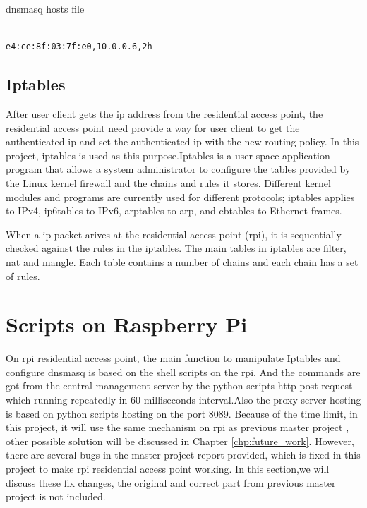\begin{algorithm}[h]
  \caption{dnsmasq hosts file}
  \label{code:dnsmasq_hosts}
  \begin{verbatim}
  
e4:ce:8f:03:7f:e0,10.0.0.6,2h
 \end{verbatim}
\end{algorithm}

\subsection{Iptables}
\par After user client gets the \gls{ip} address from the residential access point, the residential access point need provide a way for user client to get the authenticated \gls{ip} and set the authenticated \gls{ip} with the new routing policy. In this project, iptables\cite{iptables} is used as this purpose.Iptables is a user space application program that allows a system administrator to configure the tables provided by the Linux kernel firewall and the chains and rules it stores. Different kernel modules and programs are currently used for different protocols; iptables applies to IPv4, ip6tables to IPv6, arptables to \gls{arp}, and ebtables to Ethernet frames.
\par When a \gls{ip} packet arives at the residential access point (\gls{rpi}), it is sequentially checked against the rules in the iptables. The main tables in iptables are filter, nat and mangle. Each table contains a number of chains and each chain has a set of rules.

\section{Scripts on Raspberry Pi}
\label{sec:scripts_rpi}
\par On \gls{rpi} residential access point, the main function to manipulate Iptables and configure dnsmasq is based on the shell scripts on the \gls{rpi}. And the commands are got from the central management server by the python scripts \gls{http} post request which running repeatedly in 60 milliseconds interval.Also the proxy server hosting is based on python scripts hosting on the port 8089. Because of the time limit, in this project, it will use the same mechanism on \gls{rpi} as previous master project \cite{TorgeirMR}, other possible solution will be discussed in Chapter \ref{chp:future_work}. However, there are several bugs in the master project report provided, which is fixed in this project to make \gls{rpi} residential access point working. In this section,we will discuss these fix changes, the original and correct part from previous master project is not included.
